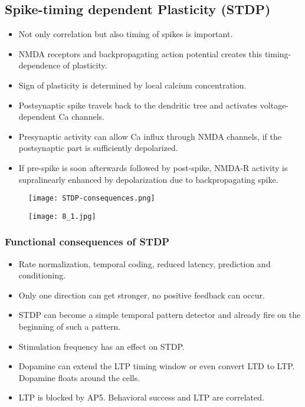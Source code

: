 \documentclass[main]{subfiles}
\begin{document}
\subsection{Spike-timing dependent Plasticity (STDP)}
\begin{itemize}[noitemsep,nolistsep]
	\item Not only correlation but also timing of spikes is important.
	\item NMDA receptors and backpropagating action potential creates this timing-dependence of plasticity.
	\item Sign of plasticity is determined by local calcium concentration.
	\item Postsynaptic spike travels back to the dendritic tree and activates voltage-dependent Ca channels.
	\item Presynaptic activity can allow Ca influx through NMDA channels, if the postsynaptic part is sufficiently depolarized.
	\item If pre-spike is soon afterwards followed by post-spike, NMDA-R activity is supralinearly enhanced by depolarization due to backpropagating spike.
\end{itemize}

\begin{figure}[H]
	\centering
	\texttt{[image: STDP-consequences.png]}
\end{figure}

\begin{figure}[H]
	\centering
	\texttt{[image: 8\_1.jpg]}
\end{figure} 

\subsubsection{Functional consequences of STDP}
\begin{itemize}[noitemsep,nolistsep]
	\item Rate normalization, temporal coding, reduced latency, prediction and conditioning.
	\item Only one direction can get stronger, no positive feedback can occur.
	\item STDP can become a simple temporal pattern detector and already fire on the beginning of such a pattern.
	\item Stimulation frequency has an effect on STDP.
	\item Dopamine can extend the LTP timing window or even convert LTD to LTP. Dopamine floats around the cells.
	\item LTP is blocked by AP5. Behavioral success and LTP are correlated.
\end{itemize}
\end{document}

